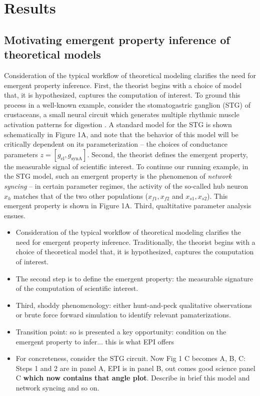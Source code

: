 \documentclass[11pt]{article}
\begin{document}


\section{Results}

\subsection{Motivating emergent property inference of theoretical models}

Consideration of the typical workflow of theoretical modeling clarifies the need for emergent property inference.  
First, the theorist begins with a choice of model that, it is hypothesized, captures the computation of interest. 
 To ground this process in a well-known example, consider the stomatogastric ganglion (STG) of crustaceans, a small neural circuit which generates multiple rhythmic muscle activation patterns for digestion \cite{marder}.  
 A standard model for the STG is shown schematically in Figure 1A, and note that the behavior of this model will be critically dependent on its parameterization -- the choices of conductance parameters $z = [g_{\text{el}}, g_{\text{synA}}]$.
Second, the theorist defines the emergent property, the measurable signal of scientific interest.  
To continue our running example, in the STG model, such an emergent property is the phenomenon of \emph{network syncing} -- in certain parameter regimes, the activity of the so-called hub neuron $x_h$ matches that of the two other populations ($x_{f1},x_{f2}$ and $x_{s1},x_{s2}$).  This emergent property is shown in Figure 1A.
Third, qualtitative parameter analysis ensues. 

\begin{itemize}
\item Consideration of the typical workflow of theoretical modeling clarifies the need for emergent property inference. Traditionally, the theorist begins with a choice of theoretical model that, it is hypothesized, captures the computation of interest.   
\item The second step is to define the emergent property: the measurable signature of the computation of scientific interest.  
\item Third, shoddy phenomenology: either hunt-and-peck qualitative observations or brute force forward simulation to identify relevant pamaterizations.  
\item Transition point: so is presented a key opportunity: condition on the emergent property to infer...  this is what EPI offers
\item For concreteness, consider the STG circuit.  Now Fig 1 C becomes A, B, C: Steps 1 and 2 are in panel A, EPI is in panel B, out comes good science panel C {\bf which now contains that angle plot}.  Describe in brief this model and network syncing and so on.  
\end{itemize}
\end{document}
